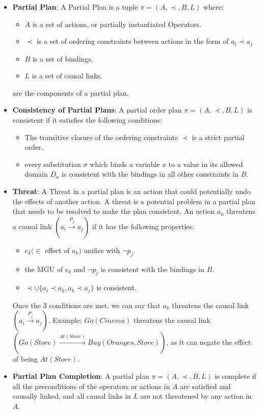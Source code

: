 \begin{itemize}
    \item  \label{def:partial_plan}
          \textbf{Partial Plan}: A Partial Plan is a tuple $\pi = (A, \prec, B, L)$ where:
          \begin{itemize}
              \item $A$ is a set of actions, or partially instantiated Operators.
              \item $\prec$ is a set of ordering constraints between actions in the form of $a_i \prec a_j$
              \item $B$ is a set of bindings.
              \item $L$ is a set of causal links.
          \end{itemize}
          are the components of a partial plan.


    \item  \label{def:consistency_partial_plan}
          \textbf{Consistency of Partial Plans}: A partial order plan $\pi = (A, \prec, B, L)$ is consistent if it satisfies the following conditions: \cite{10.5555/975615}
          \begin{itemize}
              \item The transitive closure of the ordering constraints $\prec$ is a strict partial order.
              \item every substitution $\sigma $ which binds a variable $x$ to a value in its allowed domain $D_x$ is consistent with the bindings in all other constraints in $B$.
          \end{itemize}


    \item  \label{def:threat}
          \textbf{Threat}: A Threat in a partial plan is an action that could potentially undo the effects of another action. A threat is a potential problem in a partial plan that needs to be resolved to make the plan consistent. An action $a_k$ threatens a causal link $(a_i \xrightarrow{\text{$P_j$}}  a_j)$ if it has the following properties:
          \begin{itemize}
              \item $e_k (\in$ effect of $a_k)$ unifies with $\lnot p_j$.
              \item the \ac{MGU} of $e_k$ and $\lnot p_j$ is consistent with the bindings in $B$.
              \item $\prec \cup \{a_i \prec a_k, a_k \prec a_j\}$ is consistent.
          \end{itemize}
          Once the 3 conditions are met, we can say that $a_k$ threatens the causal link $(a_i \xrightarrow{\text{$P_j$}}  a_j)$.
          Example: $Go(Cinema)$ threatens the causal link $(Go(Store) \xrightarrow{\text{$At(Store)$}} Buy(Oranges,Store))$, as it can negate the effect of being $At(Store)$.

    \item  \label{def:partial_plan_completion}
          \textbf{Partial Plan Completion}: A partial plan $\pi = (A, \prec, B, L)$ is complete if all the preconditions of the operators or actions in $A$ are satisfied and causally linked, and all causal links in $L$ are not threatened by any action in $A$.

\end{itemize}
